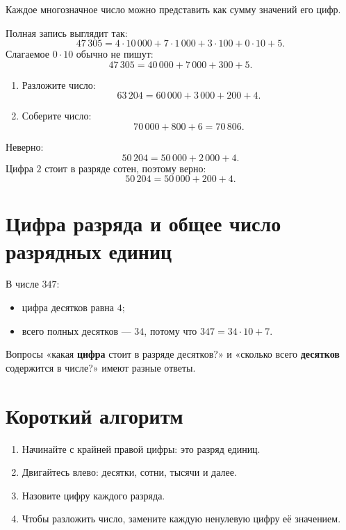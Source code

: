 Каждое многозначное число можно представить как сумму значений его цифр.

\expandedformfigure

Полная запись выглядит так:
\[
  47\,305=
  4\cdot10\,000+7\cdot1\,000+3\cdot100+0\cdot10+5.
\]
Слагаемое \(0\cdot10\) обычно не пишут:
\[
  47\,305=40\,000+7\,000+300+5.
\]

\begin{trainingtask}
  \begin{enumerate}
    \item Разложите число:
      \[
        63\,204=60\,000+3\,000+200+4.
      \]
    \item Соберите число:
      \[
        70\,000+800+6=70\,806.
      \]
  \end{enumerate}
\end{trainingtask}

\begin{warningbox}
  Неверно:
  \[
    50\,204=50\,000+2\,000+4.
  \]
  Цифра \(2\) стоит в разряде сотен, поэтому верно:
  \[
    50\,204=50\,000+200+4.
  \]
\end{warningbox}

\section{Цифра разряда и общее число разрядных единиц}

В числе \(347\):
\begin{itemize}
  \item цифра десятков равна \(4\);
  \item всего полных десятков --- \(34\), потому что \(347=34\cdot10+7\).
\end{itemize}

\begin{notebox}
  Вопросы «какая \textbf{цифра} стоит в разряде десятков?» и
  «сколько всего \textbf{десятков} содержится в числе?» имеют разные ответы.
\end{notebox}

\section{Короткий алгоритм}

\begin{conclusionbox}
  \begin{enumerate}
    \item Начинайте с крайней правой цифры: это разряд единиц.
    \item Двигайтесь влево: десятки, сотни, тысячи и далее.
    \item Назовите цифру каждого разряда.
    \item Чтобы разложить число, замените каждую ненулевую цифру её значением.
  \end{enumerate}
\end{conclusionbox}

